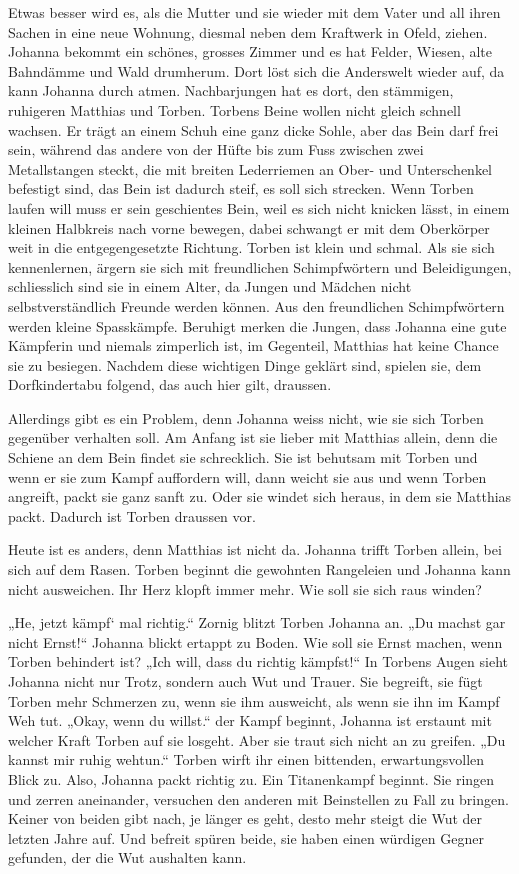 Etwas besser wird es, als die Mutter und sie wieder mit dem Vater und all ihren Sachen in eine neue Wohnung, diesmal neben dem Kraftwerk in Ofeld, ziehen. Johanna bekommt ein schönes, grosses Zimmer und es hat Felder, Wiesen, alte Bahndämme und Wald drumherum. Dort löst sich die Anderswelt wieder auf, da kann Johanna durch atmen. Nachbarjungen hat es dort, den stämmigen, ruhigeren Matthias und Torben. Torbens Beine wollen nicht gleich schnell wachsen. Er trägt an einem Schuh eine ganz dicke Sohle, aber das Bein darf frei sein, während das andere von der Hüfte bis zum Fuss zwischen zwei Metallstangen steckt, die mit breiten Lederriemen an Ober- und Unterschenkel befestigt sind, das Bein ist dadurch steif, es soll sich strecken. Wenn Torben laufen will muss er sein geschientes Bein, weil es sich nicht knicken lässt, in einem kleinen Halbkreis nach vorne bewegen, dabei schwangt er mit dem Oberkörper weit in die entgegengesetzte Richtung. Torben ist klein und schmal. Als sie sich kennenlernen, ärgern sie sich mit freundlichen Schimpfwörtern und Beleidigungen, schliesslich sind sie in einem Alter, da Jungen und Mädchen nicht selbstverständlich Freunde werden können. Aus den freundlichen Schimpfwörtern werden kleine Spasskämpfe. Beruhigt merken die Jungen, dass Johanna eine gute Kämpferin und niemals zimperlich ist, im Gegenteil, Matthias hat keine Chance sie zu besiegen. Nachdem diese wichtigen Dinge geklärt sind, spielen sie, dem Dorfkindertabu folgend, das auch hier gilt, draussen. 

Allerdings gibt es ein Problem, denn Johanna weiss nicht, wie sie sich Torben gegenüber verhalten soll. Am Anfang ist sie lieber mit Matthias allein, denn die Schiene an dem Bein findet sie schrecklich. Sie ist behutsam mit Torben und wenn er sie zum Kampf auffordern will, dann weicht sie aus und wenn Torben angreift, packt sie ganz sanft zu. Oder sie windet sich heraus, in dem sie Matthias packt. Dadurch ist Torben draussen vor.

Heute ist es anders, denn Matthias ist nicht da. Johanna trifft Torben allein, bei sich auf dem Rasen. Torben beginnt die gewohnten Rangeleien und Johanna kann nicht ausweichen. Ihr Herz klopft immer mehr. Wie soll sie sich raus winden? 

„He, jetzt kämpf` mal richtig.“ Zornig blitzt Torben Johanna an. „Du machst gar nicht Ernst!“ Johanna blickt ertappt zu Boden. Wie soll sie Ernst machen, wenn Torben behindert ist? „Ich will, dass du richtig kämpfst!“ In Torbens Augen sieht Johanna nicht nur Trotz, sondern auch Wut und Trauer. Sie begreift, sie fügt Torben mehr Schmerzen zu, wenn sie ihm ausweicht, als wenn sie ihn im Kampf Weh tut. „Okay, wenn du willst.“ der Kampf beginnt, Johanna ist erstaunt mit welcher Kraft Torben auf sie losgeht. Aber sie traut sich nicht an zu greifen. „Du kannst mir ruhig wehtun.“ Torben wirft ihr einen bittenden, erwartungsvollen Blick zu. Also, Johanna packt richtig zu. Ein Titanenkampf beginnt. Sie ringen und zerren aneinander, versuchen den anderen mit Beinstellen zu Fall zu bringen. Keiner von beiden gibt nach, je länger es geht, desto mehr steigt die Wut der letzten Jahre auf. Und befreit spüren beide, sie haben einen würdigen Gegner gefunden, der die Wut aushalten kann.

